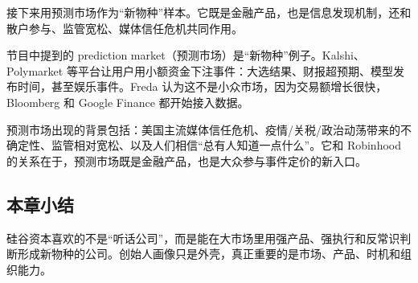 接下来用预测市场作为“新物种”样本。它既是金融产品，也是信息发现机制，还和散户参与、监管宽松、媒体信任危机共同作用。

节目中提到的 prediction market（预测市场）是“新物种”例子。Kalshi、Polymarket 等平台让用户用小额资金下注事件：大选结果、财报超预期、模型发布时间，甚至娱乐事件。Freda 认为这不是小众市场，因为交易额增长很快，Bloomberg 和 Google Finance 都开始接入数据。

预测市场出现的背景包括：美国主流媒体信任危机、疫情/关税/政治动荡带来的不确定性、监管相对宽松、以及人们相信“总有人知道一点什么”。它和 Robinhood 的关系在于，预测市场既是金融产品，也是大众参与事件定价的新入口。

\subsection{本章小结}

硅谷资本喜欢的不是“听话公司”，而是能在大市场里用强产品、强执行和反常识判断形成新物种的公司。创始人画像只是外壳，真正重要的是市场、产品、时机和组织能力。

